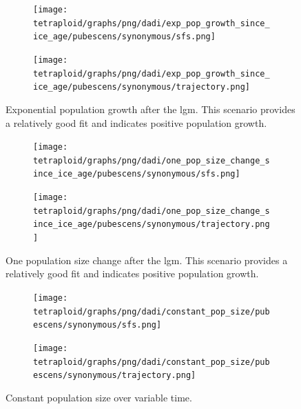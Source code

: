 \documentclass[hidelinks,11pt]{article}
\begin{document}
    \begin{figure}[H]
        \centering
        \begin{subfigure}[b]{0.465\textwidth}
            \texttt{[image: tetraploid/graphs/png/dadi/exp\_pop\_growth\_since\_ice\_age/pubescens/synonymous/sfs.png]}
        \end{subfigure}
        \hfill
        \begin{subfigure}[b]{0.525\textwidth}
            \texttt{[image: tetraploid/graphs/png/dadi/exp\_pop\_growth\_since\_ice\_age/pubescens/synonymous/trajectory.png]}
        \end{subfigure}
        \caption{Exponential population growth after the \acrshort{lgm}. This scenario provides a relatively good fit and indicates positive population growth.}
        \label{fig:exp_pop_growth_since_ice_age_pubescens}
    \end{figure}

    \begin{figure}[H]
        \centering
        \begin{subfigure}[b]{0.465\textwidth}
            \texttt{[image: tetraploid/graphs/png/dadi/one\_pop\_size\_change\_since\_ice\_age/pubescens/synonymous/sfs.png]}
        \end{subfigure}
        \hfill
        \begin{subfigure}[b]{0.525\textwidth}
            \texttt{[image: tetraploid/graphs/png/dadi/one\_pop\_size\_change\_since\_ice\_age/pubescens/synonymous/trajectory.png]}
        \end{subfigure}
        \caption{One population size change after the \acrshort{lgm}. This scenario provides a relatively good fit and indicates positive population growth.}
        \label{fig:one_pop_size_change_since_ice_age_pubescens}
    \end{figure}

    \begin{figure}[H]
        \centering
        \begin{subfigure}[b]{0.465\textwidth}
            \texttt{[image: tetraploid/graphs/png/dadi/constant\_pop\_size/pubescens/synonymous/sfs.png]}
        \end{subfigure}
        \hfill
        \begin{subfigure}[b]{0.525\textwidth}
            \texttt{[image: tetraploid/graphs/png/dadi/constant\_pop\_size/pubescens/synonymous/trajectory.png]}
        \end{subfigure}
        \caption{Constant population size over variable time.}
        \label{fig:constant_pop_size_pubescens}
    \end{figure}
\end{document}
